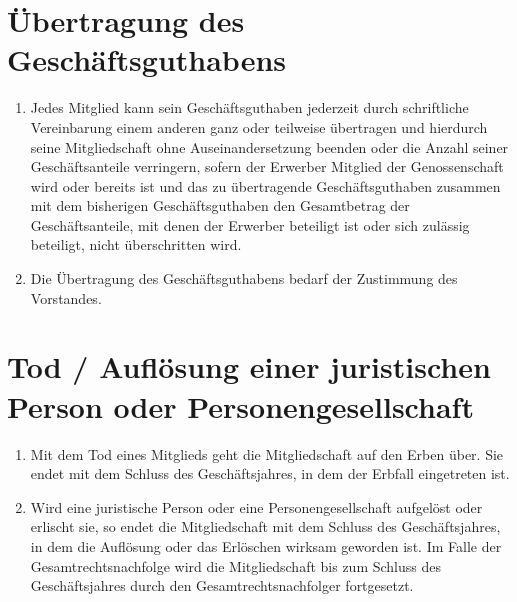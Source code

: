 \documentclass[a4paper, 12pt]{scrartcl}
\begin{document}
\section{Übertragung des Geschäftsguthabens}
\begin{enumerate}
  \item Jedes Mitglied kann sein Geschäftsguthaben jederzeit durch schriftliche Vereinbarung einem anderen ganz oder teilweise übertragen und hierdurch seine Mitgliedschaft ohne Auseinandersetzung beenden oder die Anzahl seiner Geschäftsanteile verringern, sofern der Erwerber Mitglied der Genossenschaft wird oder bereits ist und das zu übertragende Geschäftsguthaben zusammen mit dem bisherigen Geschäftsguthaben den Gesamtbetrag der Geschäftsanteile, mit denen der Erwerber beteiligt ist oder sich zulässig beteiligt, nicht überschritten wird.
  \item Die Übertragung des Geschäftsguthabens bedarf der Zustimmung des Vorstandes.
\end{enumerate}

\section{Tod / Auflösung einer juristischen Person oder Personengesellschaft}
\begin{enumerate}
  \item Mit dem Tod eines Mitglieds geht die Mitgliedschaft auf den Erben über. Sie endet mit dem Schluss des Geschäftsjahres, in dem der Erbfall eingetreten ist.
  \item Wird eine juristische Person oder eine Personengesellschaft aufgelöst oder erlischt sie, so endet die Mitgliedschaft mit dem Schluss des Geschäftsjahres, in dem die Auflösung oder das Erlöschen wirksam geworden ist. Im Falle der Gesamtrechtsnachfolge wird die Mitgliedschaft bis zum Schluss des Geschäftsjahres durch den Gesamtrechtsnachfolger fortgesetzt.
\end{enumerate}
\end{document}
